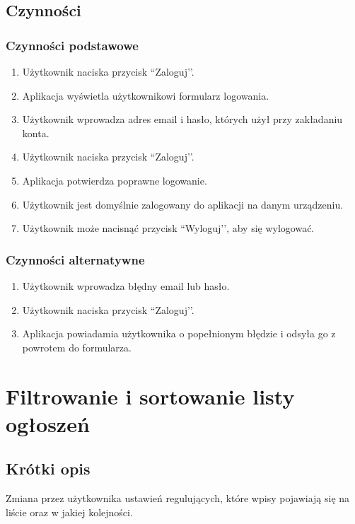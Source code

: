 \documentclass[12pt,a4paper,twoside]{article}
\begin{document}
    
    \subsection{Czynności}
    
    
    \subsubsection{Czynności podstawowe}
    
    
    \begin{enumerate}
        \item Użytkownik naciska przycisk ``Zaloguj’’.
        \item Aplikacja wyświetla użytkownikowi formularz logowania.
        \item Użytkownik wprowadza adres email i hasło, których użył przy zakładaniu konta.
        \item Użytkownik naciska przycisk ``Zaloguj’’.
        \item Aplikacja potwierdza poprawne logowanie.
     \item Użytkownik jest domyślnie zalogowany do aplikacji na danym urządzeniu.
     \item Użytkownik może nacisnąć przycisk ``Wyloguj’’, aby się wylogować.
    \end{enumerate}
    
    
    \subsubsection{Czynności alternatywne}
    
    
    \begin{enumerate}
        \item Użytkownik wprowadza błędny email lub hasło.
        \item Użytkownik naciska przycisk ``Zaloguj’’.
        \item Aplikacja powiadamia użytkownika o popełnionym błędzie i odsyła go z powrotem do formularza.
    \end{enumerate}


    \section{Filtrowanie i sortowanie listy ogłoszeń}
    
    
    \subsection{Krótki opis}
    Zmiana przez użytkownika ustawień regulujących, które wpisy pojawiają się na liście oraz w jakiej kolejności.
    
\end{document}
